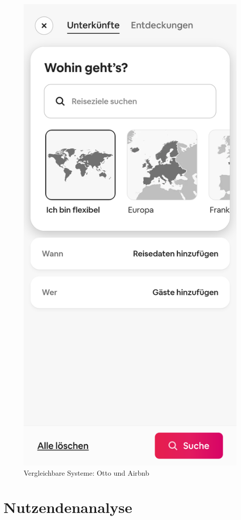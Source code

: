 \begin{figure}[h]
        \includegraphics[scale=0.1]{Bilder/Arbnbnsuche.png}
        \caption{Vergleichbare Systeme: Otto und Airbnb}\label{fig:system}
\end{figure}
\section{Nutzendenanalyse}

